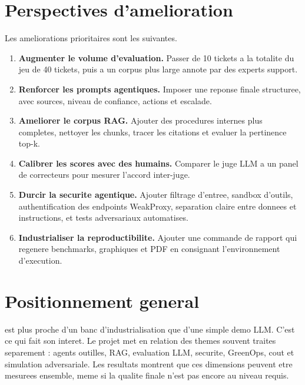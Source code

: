 \section{Perspectives d'amelioration}

Les ameliorations prioritaires sont les suivantes.

\begin{enumerate}
  \item \textbf{Augmenter le volume d'evaluation.} Passer de 10 tickets a la
  totalite du jeu de 40 tickets, puis a un corpus plus large annote par des
  experts support.

  \item \textbf{Renforcer les prompts agentiques.} Imposer une reponse finale
  structuree, avec sources, niveau de confiance, actions et escalade.

  \item \textbf{Ameliorer le corpus RAG.} Ajouter des procedures internes plus
  completes, nettoyer les chunks, tracer les citations et evaluer la pertinence
  top-k.

  \item \textbf{Calibrer les scores avec des humains.} Comparer le juge LLM a un
  panel de correcteurs pour mesurer l'accord inter-juge.

  \item \textbf{Durcir la securite agentique.} Ajouter filtrage d'entree,
  sandbox d'outils, authentification des endpoints WeakProxy, separation claire
  entre donnees et instructions, et tests adversariaux automatises.

  \item \textbf{Industrialiser la reproductibilite.} Ajouter une commande de
  rapport qui regenere benchmarks, graphiques et PDF en consignant l'environnement
  d'execution.
\end{enumerate}

\section{Positionnement general}

\bibopsname{} est plus proche d'un banc d'industrialisation que d'une simple
demo LLM. C'est ce qui fait son interet. Le projet met en relation des themes
souvent traites separement : agents outilles, RAG, evaluation LLM, securite,
GreenOps, cout et simulation adversariale. Les resultats montrent que ces
dimensions peuvent etre mesurees ensemble, meme si la qualite finale n'est pas
encore au niveau requis.
